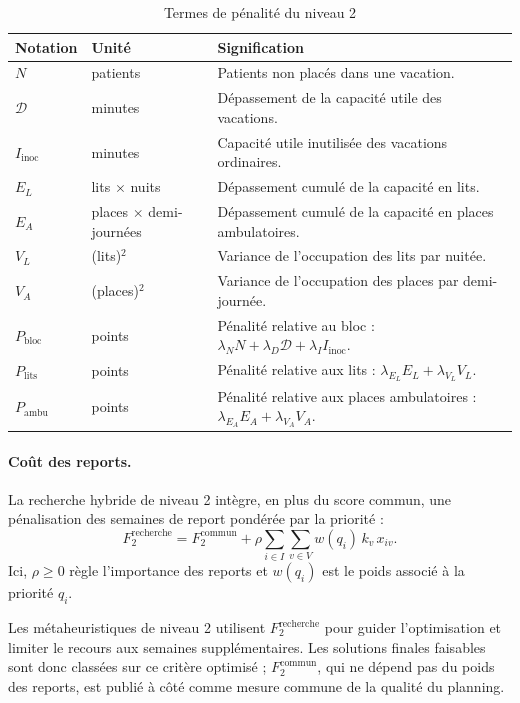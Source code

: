 \documentclass[11pt,a4paper]{article}
\begin{document}
\begin{table}[htbp]
\centering\footnotesize
\caption{Termes de pénalité du niveau 2}
\label{tab:termes_n2}
\begin{tabularx}{\linewidth}{@{}p{1.6cm}p{2.6cm}X@{}}
\toprule
\textbf{Notation} & \textbf{Unité} & \textbf{Signification} \\
\midrule
$N$ & patients & Patients non placés dans une vacation. \\
$\mathcal{D}$ & minutes & Dépassement de la capacité utile des vacations. \\
$I_{\mathrm{inoc}}$ & minutes & Capacité utile inutilisée des vacations ordinaires. \\
$E_L$ & lits $\times$ nuits & Dépassement cumulé de la capacité en lits. \\
$E_A$ & places $\times$ demi-journées & Dépassement cumulé de la capacité en places ambulatoires. \\
$V_L$ & (lits)$^2$ & Variance de l'occupation des lits par nuitée. \\
$V_A$ & (places)$^2$ & Variance de l'occupation des places par demi-journée. \\
$P_{\mathrm{bloc}}$ & points & Pénalité relative au bloc : $\lambda_N N+\lambda_D\mathcal{D}+\lambda_I I_{\mathrm{inoc}}$. \\
$P_{\mathrm{lits}}$ & points & Pénalité relative aux lits : $\lambda_{E_L}E_L+\lambda_{V_L}V_L$. \\
$P_{\mathrm{ambu}}$ & points & Pénalité relative aux places ambulatoires : $\lambda_{E_A}E_A+\lambda_{V_A}V_A$. \\
\bottomrule
\end{tabularx}
\end{table}

\paragraph{Coût des reports.}
La recherche hybride de niveau 2 intègre, en plus du score commun, une pénalisation des semaines de report pondérée par la priorité :
\begin{equation}
\boxed{F_2^{\mathrm{recherche}}=F_2^{\mathrm{commun}}+\rho\sum_{i\in I}\sum_{v\in V}w(q_i)\,k_v\,x_{iv}.}
\label{eq:F2recherche}
\end{equation}
Ici, $\rho\ge0$ règle l'importance des reports et $w(q_i)$ est le poids associé à la priorité $q_i$.


Les métaheuristiques de niveau 2 utilisent
$F_2^{\mathrm{recherche}}$ pour guider l'optimisation
et limiter le recours aux semaines supplémentaires.
Les solutions finales faisables sont donc classées sur ce
critère optimisé ; $F_2^{\mathrm{commun}}$, qui ne dépend
pas du poids des reports, est publié à côté comme mesure
commune de la qualité du planning.
\end{document}
